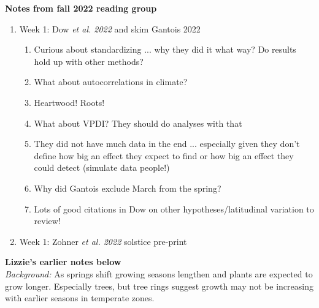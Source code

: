 \documentclass[11pt,letter]{article}
\begin{document}

\renewcommand{\refname}{\CHead{}}

{\bf Notes from fall 2022 reading group}\\
\begin{enumerate}
\item Week 1: Dow \emph{et al. 2022} and skim Gantois 2022
\begin{enumerate}
\item Curious about standardizing ... why they did it what way? Do results hold up with other methods?
\item What about autocorrelations in climate?
\item Heartwood! Roots!
\item What about VPDI? They should do analyses with that
\item They did not have much data in the end ... especially given they don't define how big an effect they expect to find or how big an effect they could detect (simulate data people!)
\item Why did Gantois exclude March from the spring?
\item Lots of good citations in Dow on other hypotheses/latitudinal variation to review!
\end{enumerate}
\item Week 1: Zohner \emph{et al. 2022} solstice pre-print
\end{enumerate}

\newpage
{\bf Lizzie's earlier notes below}\\


\emph{Background:} As springs shift growing seasons lengthen and plants are expected to grow longer. Especially trees, but tree rings suggest growth may not be increasing with earlier seasons in temperate zones. \\
\end{document}
